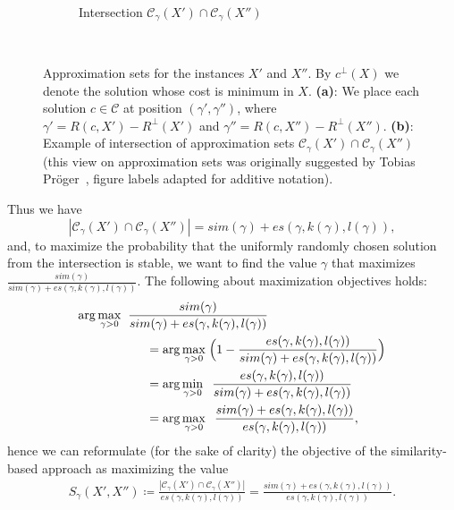 \begin{figure}[t!]
\begin{subfigure}[b]{.55\textwidth}
      \caption{Intersection $\mathcal{C}_{\gamma}(X')\cap \mathcal{C}_{\gamma}(X'')$}
  \end{subfigure}
  \\[.5cm]
  \caption{
    Approximation sets for the instances $X'$ and $X''$. By $c^\bot(X)$ we
    denote the solution whose cost is minimum in $X$. \textbf{(a)}: We
    place each solution $c \in \mathcal{C}$ at position
    $(\gamma',\gamma'')$, where $\gamma'=R(c, X') - R^\bot(X')$ and
    $\gamma''=R(c, X'') - R^\bot(X'')$. \textbf{(b)}: Example of
    intersection of approximation sets $\mathcal{C}_{\gamma}(X')\cap
    \mathcal{C}_{\gamma}(X'')$ (this view on approximation sets was 
    originally suggested by Tobias Pröger~\citep[cf.][]{jcss:2017}, figure labels
    adapted for additive notation).}
  \label{fig:approx_sets--schematic}
\end{figure}
%
Thus we have 
\begin{equation}
  |{\mathcal{C}_\gamma}(X') \cap {\mathcal{C}_\gamma}(X'')|=sim(\gamma)+
    es(\gamma,k(\gamma),l(\gamma)),
\end{equation}
and, to maximize the probability that the uniformly randomly
chosen solution from the intersection is stable, we want to find the value $\gamma$ that maximizes
$\frac{sim(\gamma)}{sim(\gamma)+es(\gamma,k(\gamma),l(\gamma))}$. The following about 
maximization objectives holds:
\begin{align}
  \arg \max_{\gamma>0} &\;\; \frac{sim(\gamma)}{sim(\gamma)+es(\gamma,k(\gamma),l(\gamma))}  \notag \\
    &\qquad= \arg \max_{\gamma > 0} \; \Bigl(
        1 - \frac{es(\gamma,k(\gamma),l(\gamma))}{sim(\gamma)+es(\gamma,k(\gamma),l(\gamma))}
      \Bigr) \notag \\
    &\qquad= \arg \min_{\gamma > 0} \;\; \frac{es(\gamma,k(\gamma),l(\gamma))}{sim(\gamma)+es(\gamma,k(\gamma),l(\gamma))}
      \notag \\
    &\qquad= \arg \max_{\gamma > 0} \;\; \frac{sim(\gamma)+es(\gamma,k(\gamma),l(\gamma))}{es(\gamma,k(\gamma),l(\gamma))},
\end{align}
hence we can reformulate (for the sake of clarity) the objective of the similarity-based
approach as maximizing the value
\begin{align}
  \label{eq:similarity}
  S_\gamma(X',X'')
    \coloneqq \frac{|{\mathcal{C}_\gamma}(X') \cap {\mathcal{C}_\gamma}(X'')|}{es(\gamma,k(\gamma),l(\gamma))}
    = \frac{sim(\gamma)+es(\gamma,k(\gamma),l(\gamma))}{es(\gamma,k(\gamma),l(\gamma))}.
\end{align}


